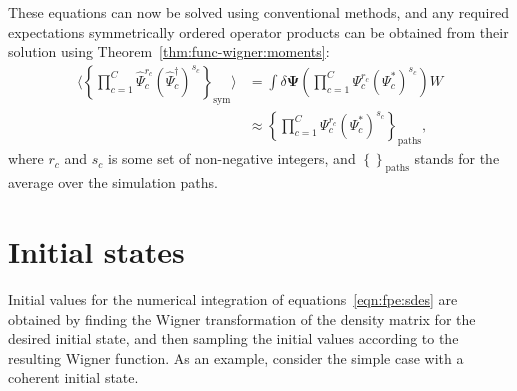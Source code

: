\documentclass[12pt,aip,jmp,amssymb,amsmath]{revtex4-1}
\begin{document}
These equations can now be solved using conventional methods, and any required expectations symmetrically ordered operator products can be obtained from their solution using Theorem~\ref{thm:func-wigner:moments}:
\begin{equation}\begin{split}
    \langle \left\{
        \prod_{c=1}^C \hat{\Psi}_c^{r_c} (\hat{\Psi}_c^\dagger)^{s_c}
    \right\}_{\mathrm{sym}} \rangle
    & = \int \delta \boldsymbol{\Psi} \left(
            \prod_{c=1}^C \Psi_c^{r_c} (\Psi_c^*)^{s_c}
        \right) W \\
    & \approx \left\{
        \prod_{c=1}^C \Psi_c^{r_c} (\Psi_c^*)^{s_c}
    \right\}_{\mathrm{paths}},
\end{split}\end{equation}
where $r_c$ and $s_c$ is some set of non-negative integers, and $\left\{\right\}_{\mathrm{paths}}$ stands for the average over the simulation paths.



\section{Initial states}

Initial values for the numerical integration of equations~\ref{eqn:fpe:sdes} are obtained by finding the Wigner transformation of the density matrix for the desired initial state, and then sampling the initial values according to the resulting Wigner function.
As an example, consider the simple case with a coherent initial state.
\end{document}
